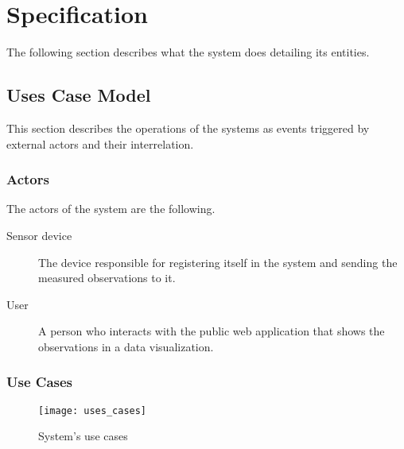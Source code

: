 \chapter{Specification}

The following section describes what the system does detailing its entities.

\section{Uses Case Model}

This section describes the operations of the systems as events triggered by external actors and their interrelation.

\subsection{Actors} \label{actors}

The actors of the system are the following.

\begin{description}
	\item[Sensor device] The device responsible for registering itself in the system and sending the measured observations to it.
	\item[User] A person who interacts with the public web application that shows the observations in a data visualization.
\end{description}

\subsection{Use Cases}

\begin{figure}[ht]
	\centering
	\texttt{[image: uses\_cases]}
	\caption{System's use cases}
	\label{fig:use_cases}
\end{figure}

